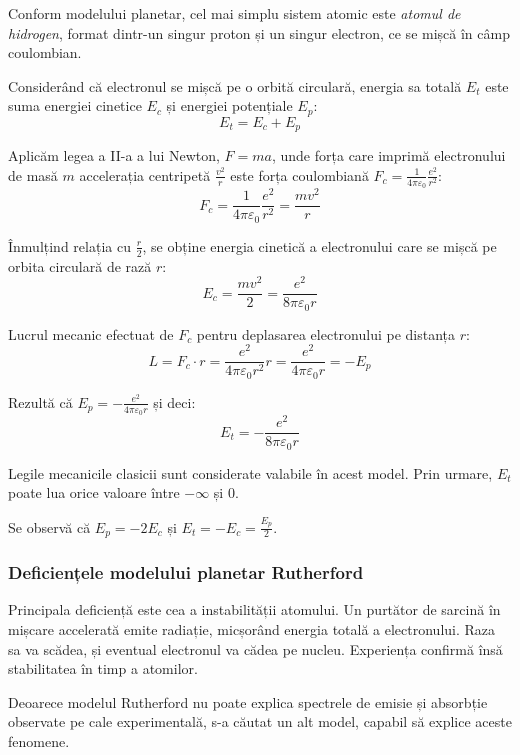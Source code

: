 Conform modelului planetar, cel mai simplu sistem atomic este
\emph{atomul de hidrogen}, format dintr-un singur proton și un singur electron,
ce se mișcă în câmp coulombian.

Considerând că electronul se mișcă pe o orbită circulară, energia sa totală
$E_t$ este suma energiei cinetice $E_c$ și energiei potențiale $E_p$:
\[ E_t = E_c + E_p \]

Aplicăm legea a II-a a lui Newton, \( F = ma \), unde forța care imprimă
electronului de masă $m$ accelerația centripetă \( \frac{v^2}{r} \) este forța
coulombiană \( F_c = \frac{1}{4\pi\varepsilon_0} \frac{e^2}{r^2} \):
\[ F_c = \frac{1}{4\pi\varepsilon_0} \frac{e^2}{r^2} = \frac{mv^2}{r} \]

Înmulțind relația cu \( \frac{r}{2} \), se obține energia cinetică a
electronului care se mișcă pe orbita circulară de rază $r$:
\[ E_c = \frac{mv^2}{2} = \frac{e^2}{8\pi\varepsilon_0 r} \]

Lucrul mecanic efectuat de $F_c$ pentru deplasarea electronului pe distanța
$r$:
\[
    L = F_c \cdot r = \frac{e^2}{4\pi\varepsilon_0 r^2} r
    = \frac{e^2}{4\pi\varepsilon_0 r} = - E_p
\]

Rezultă că \( E_p = - \frac{e^2}{4\pi\varepsilon_0 r} \) și deci:
\begin{equation}
    E_t = - \frac{e^2}{8\pi\varepsilon_0 r}
    \label{eq:1}
\end{equation}

Legile mecanicile clasicii sunt considerate valabile în acest model. Prin urmare, $E_t$ poate lua orice valoare între $-\infty$ și 0.

Se observă că \( E_p = -2E_c \) și \( E_t = -E_c = \frac{E_p}{2} \).

\subsubsection*{Deficiențele modelului planetar Rutherford}

Principala deficiență este cea a instabilității atomului. Un purtător de sarcină în
mișcare accelerată emite radiație, micșorând energia totală a electronului.
Raza sa va scădea, și eventual electronul va cădea pe nucleu. Experiența
confirmă însă stabilitatea în timp a atomilor.

Deoarece modelul Rutherford nu poate explica spectrele de emisie și absorbție
observate pe cale experimentală, s-a căutat un alt model, capabil să explice
aceste fenomene.
